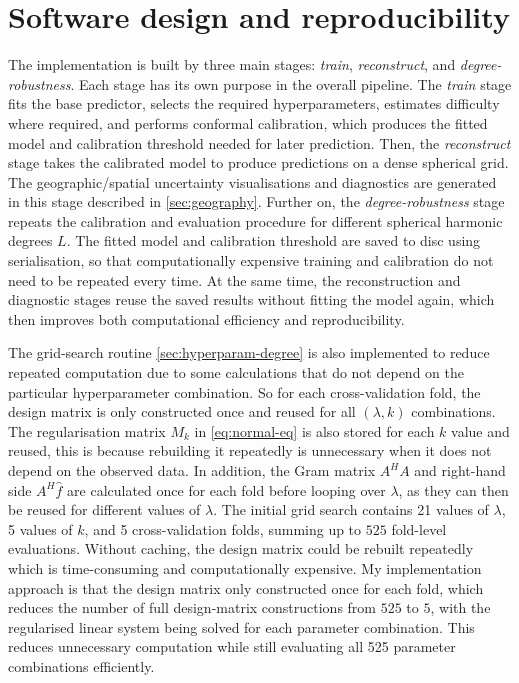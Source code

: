 \section{Software design and reproducibility}
\label{sec:software-design}

The implementation is built by three main stages: \emph{train}, \emph{reconstruct}, and \emph{degree-robustness}. Each stage has its own purpose in the overall pipeline. The \emph{train} stage fits the base predictor, selects the required hyperparameters, estimates difficulty where required, and performs conformal calibration, which produces the fitted model and calibration threshold needed for later prediction. Then, the \emph{reconstruct} stage takes the calibrated model to produce predictions on a dense spherical grid. The geographic/spatial uncertainty visualisations and diagnostics are generated in this stage described in \cref{sec:geography}. Further on, the \emph{degree-robustness} stage repeats the calibration and evaluation procedure for different spherical harmonic degrees $L$. The fitted model and calibration threshold are saved to disc using serialisation, so that computationally expensive training and calibration do not need to be repeated every time. At the same time, the reconstruction and diagnostic stages reuse the saved results without fitting the model again, which then improves both computational efficiency and reproducibility.
 
The grid-search routine \cref{sec:hyperparam-degree} is also implemented to reduce repeated computation due to some calculations that do not depend on the particular hyperparameter combination. So for each cross-validation fold, the design matrix is only constructed once and reused for all $(\lambda,k)$ combinations. The regularisation matrix $M_k$ in \cref{eq:normal-eq} is also stored for each  $k$ value and reused, this is because rebuilding it repeatedly is unnecessary when it does not depend on the observed data. In addition, the Gram matrix $A^HA$ and right-hand side $A^H\hat f$ are calculated once for each fold before looping over $\lambda$, as they can then be reused for different values of $\lambda$. The initial grid search contains 21 values of $\lambda$, 5 values of $k$, and 5 cross-validation folds, summing up to $525$ fold-level evaluations. Without caching, the design matrix could be rebuilt repeatedly which is time-consuming and computationally expensive. My implementation approach is that the design matrix only constructed once for each fold, which reduces the number of full design-matrix constructions from $525$ to $5$, with the regularised linear system being solved for each parameter combination. This reduces unnecessary computation while still evaluating all 525 parameter combinations efficiently.

